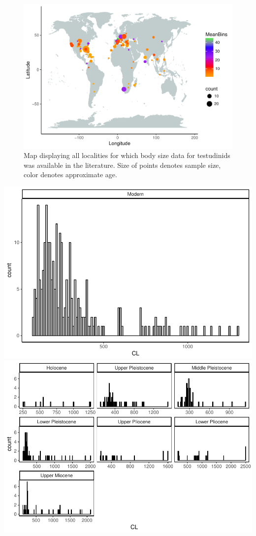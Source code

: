 \documentclass[]{article}
\begin{document}
\begin{figure}[htbp]
\centering
\includegraphics{MA_JJ_files/figure-latex/Map body size data set-1.pdf}
\caption{Map displaying all localities for which body size data for
testudinids was available in the literature. Size of points denotes
sample size, color denotes approximate age.}
\end{figure}

\includegraphics{MA_JJ_files/figure-latex/Histograms of body size data-1.pdf}
\includegraphics{MA_JJ_files/figure-latex/Histograms of body size data-2.pdf}
\end{document}
